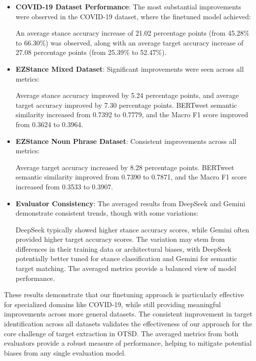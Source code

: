 \documentclass[twocolumn,11pt,letterpaper]{article}
\begin{document}
\begin{itemize}
    \item \textbf{COVID-19 Dataset Performance}: The most substantial improvements were observed in the COVID-19 dataset, where the finetuned model achieved: 
    
    An average stance accuracy increase of 21.02 percentage points (from 45.28\% to 66.30\%) was observed, along with an average target accuracy increase of 27.08 percentage points (from 25.39\% to 52.47\%).
    
    \item \textbf{EZStance Mixed Dataset}: Significant improvements were seen across all metrics: 
    
    Average stance accuracy improved by 5.24 percentage points, and average target accuracy improved by 7.30 percentage points. BERTweet semantic similarity increased from 0.7392 to 0.7779, and the Macro F1 score improved from 0.3624 to 0.3964.
    
    \item \textbf{EZStance Noun Phrase Dataset}: Consistent improvements across all metrics: 
    
    Average target accuracy increased by 8.28 percentage points. BERTweet semantic similarity improved from 0.7390 to 0.7871, and the Macro F1 score increased from 0.3533 to 0.3907.
    
    \item \textbf{Evaluator Consistency}: The averaged results from DeepSeek and Gemini demonstrate consistent trends, though with some variations: 
    
    DeepSeek typically showed higher stance accuracy scores, while Gemini often provided higher target accuracy scores. The variation may stem from differences in their training data or architectural biases, with DeepSeek potentially better tuned for stance classification and Gemini for semantic target matching. The averaged metrics provide a balanced view of model performance.
\end{itemize}

These results demonstrate that our finetuning approach is particularly effective for specialized domains like COVID-19, while still providing meaningful improvements across more general datasets. The consistent improvement in target identification across all datasets validates the effectiveness of our approach for the core challenge of target extraction in OTSD. The averaged metrics from both evaluators provide a robust measure of performance, helping to mitigate potential biases from any single evaluation model.
\end{document}
